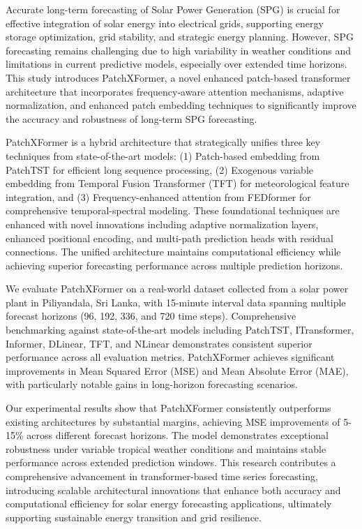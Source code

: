 \documentclass[12pt]{uomthesis}
\begin{document}
\begin{abstractpage}

Accurate long-term forecasting of Solar Power Generation (SPG) is crucial for effective integration of solar energy into electrical grids, supporting energy storage optimization, grid stability, and strategic energy planning. However, SPG forecasting remains challenging due to high variability in weather conditions and limitations in current predictive models, especially over extended time horizons. This study introduces PatchXFormer, a novel enhanced patch-based transformer architecture that incorporates frequency-aware attention mechanisms, adaptive normalization, and enhanced patch embedding techniques to significantly improve the accuracy and robustness of long-term SPG forecasting.

PatchXFormer is a hybrid architecture that strategically unifies three key techniques from state-of-the-art models: (1) Patch-based embedding from PatchTST \cite{nie2022patchtst} for efficient long sequence processing, (2) Exogenous variable embedding from Temporal Fusion Transformer (TFT) \cite{lim2021temporal} for meteorological feature integration, and (3) Frequency-enhanced attention from FEDformer \cite{zhou2022fedformer} for comprehensive temporal-spectral modeling. These foundational techniques are enhanced with novel innovations including adaptive normalization layers, enhanced positional encoding, and multi-path prediction heads with residual connections. The unified architecture maintains computational efficiency while achieving superior forecasting performance across multiple prediction horizons.

We evaluate PatchXFormer on a real-world dataset collected from a solar power plant in Piliyandala, Sri Lanka, with 15-minute interval data spanning multiple forecast horizons (96, 192, 336, and 720 time steps). Comprehensive benchmarking against state-of-the-art models including PatchTST, ITransformer, Informer, DLinear, TFT, and NLinear demonstrates consistent superior performance across all evaluation metrics. PatchXFormer achieves significant improvements in Mean Squared Error (MSE) and Mean Absolute Error (MAE), with particularly notable gains in long-horizon forecasting scenarios.

Our experimental results show that PatchXFormer consistently outperforms existing architectures by substantial margins, achieving MSE improvements of 5-15\% across different forecast horizons. The model demonstrates exceptional robustness under variable tropical weather conditions and maintains stable performance across extended prediction windows. This research contributes a comprehensive advancement in transformer-based time series forecasting, introducing scalable architectural innovations that enhance both accuracy and computational efficiency for solar energy forecasting applications, ultimately supporting sustainable energy transition and grid resilience.

\end{abstractpage}
\end{document}
